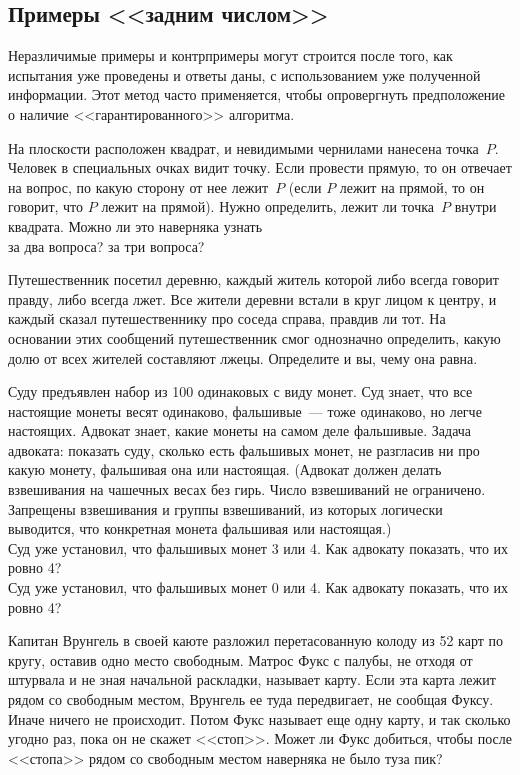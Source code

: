 \subsection*{Примеры <<задним числом>>}
Неразличимые примеры и контрпримеры могут строится после того, как испытания
уже проведены и ответы даны, с использованием уже полученной информации.
Этот метод часто применяется, чтобы опровергнуть предположение о наличие
<<гарантированного>> алгоритма.

\begin{problems}

\item
На плоскости расположен квадрат, и невидимыми чернилами нанесена точка~$P$.
Человек в специальных очках видит точку.
Если провести прямую, то он отвечает на вопрос, по какую сторону от нее
лежит~$P$ (если $P$ лежит на прямой, то он говорит, что $P$ лежит на прямой).
Нужно определить, лежит ли точка~$P$ внутри квадрата.
Можно ли это наверняка узнать
\\
\sp за два вопроса?
\qquad
\sp за три вопроса?

\item
Путешественник посетил деревню, каждый житель которой либо всегда говорит
правду, либо всегда лжет.
Все жители деревни встали в круг лицом к центру, и каждый сказал
путешественнику про соседа справа, правдив ли тот.
На основании этих сообщений путешественник смог однозначно определить, какую
долю от всех жителей составляют лжецы.
Определите и вы, чему она равна.

\item
Суду предъявлен набор из 100 одинаковых с виду монет.
Суд знает, что все настоящие монеты весят одинаково, фальшивые~--- тоже
одинаково, но легче настоящих.
Адвокат знает, какие монеты на самом деле фальшивые.
Задача адвоката: показать суду, сколько есть фальшивых монет, не разгласив
ни про какую монету, фальшивая она или настоящая.
(Адвокат должен делать взвешивания на чашечных весах без гирь.
Число взвешиваний не ограничено.
Запрещены взвешивания и группы взвешиваний, из которых логически выводится, что
конкретная монета фальшивая или настоящая.)
\\
\sp
Суд уже установил, что фальшивых монет 3 или 4.
Как адвокату показать, что их ровно 4?
\\
\sp
Суд уже установил, что фальшивых монет 0 или 4.
Как адвокату показать, что их ровно 4?

\item
Капитан Врунгель в своей каюте разложил перетасованную колоду из 52 карт
по кругу, оставив одно место свободным.
Матрос Фукс с палубы, не отходя от штурвала и не зная начальной раскладки,
называет карту.
Если эта карта лежит рядом со свободным местом, Врунгель ее туда передвигает,
не сообщая Фуксу.
Иначе ничего не происходит.
Потом Фукс называет еще одну карту, и так сколько угодно раз, пока он не скажет
<<стоп>>.
Может ли Фукс добиться, чтобы после <<стопа>> рядом со свободным местом
наверняка не было туза пик?

\end{problems}

